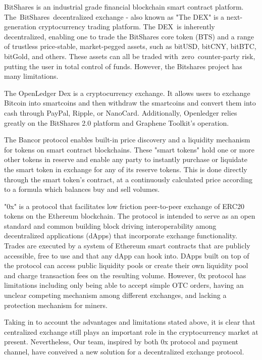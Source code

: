 \documentclass[UTF8,nofonts]{article}
\begin{document}
BitShares\cite{schuhbitshares}\cite{schuh2015bitshares} is an industrial grade financial blockchain smart contract platform. The BitShares decentralized exchange - also known as "The DEX" is a next-generation cryptocurrency trading platform. The DEX is inherently decentralized, enabling one to trade the BitShares core token (BTS) and a range of trustless price-stable, market-pegged assets, such as bitUSD, bitCNY, bitBTC, bitGold, and others. These assets can all be traded with zero counter-party risk, putting the user in total control of funds. However, the Bitshares project has many limitations.

The OpenLedger Dex\cite{openledger} is a cryptocurrency exchange. It allows users to exchange Bitcoin into smartcoins and then withdraw the smartcoins and convert them into cash through PayPal, Ripple, or NanoCard. Additionally, Openledger relies greatly on the BitShares 2.0 platform and Graphene Toolkit's operation.

The Bancor\cite{bancor}\cite{hanson2012logarithmic} protocol enables built-in price discovery and a liquidity mechanism for tokens on smart contract blockchains. These "smart tokens" hold one or more other tokens in reserve and enable any party to instantly purchase or liquidate the smart token in exchange for any of its reserve tokens. This is done directly through the smart token's contract, at a continuously calculated price according to a formula which balances buy and sell volumes.

"0x"\cite{warren20170x} is a protocol that facilitates low friction peer-to-peer exchange of ERC20\cite{ERC20} tokens on the Ethereum blockchain. The protocol is intended to serve as an open standard and common building block driving interoperability among decentralized applications (dApps) that incorporate exchange functionality. Trades are executed by a system of Ethereum smart contracts that are publicly accessible, free to use and that any dApp can hook into. DApps built on top of the protocol can access public liquidity pools or create their own liquidity pool and charge transaction fees on the resulting volume. However, 0x protocol has limitations including  only being able to accept simple OTC orders, having an unclear competing mechanism among different exchanges, and lacking a protection mechanism for miners.

Taking in to account the advantages and limitations stated above, it is clear that centralized exchange still plays an important role in the cryptocurrency market at present. Nevertheless, Our team, inspired by both 0x protocol and payment channel, have conveived a new solution for a decentralized exchange protocol.
\end{document}
